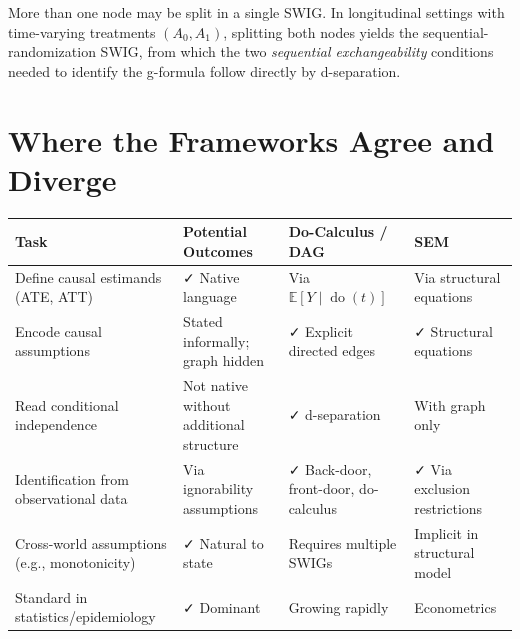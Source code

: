 \documentclass[
  a4paper,
]{book}
\newcounter{none} %
\newcommand{\doop}{\operatorname{do}}
\newcommand{\E}{\mathbb{E}}
\begin{document}
\begin{tcolorbox}[enhanced jigsaw, arc=.35mm, bottomrule=.15mm, bottomtitle=1mm, breakable, colback=white, colbacktitle=quarto-callout-note-color!10!white, colframe=quarto-callout-note-color-frame, coltitle=black, left=2mm, leftrule=.75mm, opacityback=0, opacitybacktitle=0.6, rightrule=.15mm, title={Remark}, titlerule=0mm, toprule=.15mm, toptitle=1mm]

More than one node may be split in a single SWIG. In longitudinal
settings with time-varying treatments \((A_0, A_1)\), splitting both
nodes yields the sequential-randomization SWIG, from which the two
\emph{sequential exchangeability} conditions needed to identify the
g-formula follow directly by d-separation.

\end{tcolorbox}

\section{Where the Frameworks Agree and Diverge}\label{sec-comparison}

{\def\LTcaptype{none} %
\begin{longtable}[]{@{}
  >{\raggedright\arraybackslash}p{}
  >{\raggedright\arraybackslash}p{}
  >{\raggedright\arraybackslash}p{}
  >{\raggedright\arraybackslash}p{}@{}}
\toprule\noalign{}
\begin{minipage}[b]{\linewidth}\raggedright
\textbf{Task}
\end{minipage} & \begin{minipage}[b]{\linewidth}\raggedright
\textbf{Potential Outcomes}
\end{minipage} & \begin{minipage}[b]{\linewidth}\raggedright
\textbf{Do-Calculus / DAG}
\end{minipage} & \begin{minipage}[b]{\linewidth}\raggedright
\textbf{SEM}
\end{minipage} \\
\midrule\noalign{}
\endhead
\bottomrule\noalign{}
\endlastfoot
Define causal estimands (ATE, ATT) & ✓ Native language & Via
\(\E[Y \mid \doop(t)]\) & Via structural equations \\
Encode causal assumptions & Stated informally; graph hidden & ✓ Explicit
directed edges & ✓ Structural equations \\
Read conditional independence & Not native without additional structure
& ✓ d-separation & With graph only \\
Identification from observational data & Via ignorability assumptions &
✓ Back-door, front-door, do-calculus & ✓ Via exclusion restrictions \\
Cross-world assumptions (e.g., monotonicity) & ✓ Natural to state &
Requires multiple SWIGs & Implicit in structural model \\
Standard in statistics/epidemiology & ✓ Dominant & Growing rapidly &
Econometrics \\
\end{longtable}
}
\end{document}
